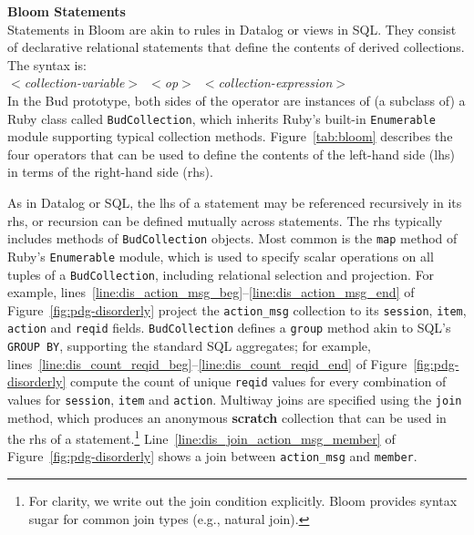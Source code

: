 \textbf{Bloom Statements}\\
\noindent
Statements in Bloom are akin to rules in Datalog or views in SQL.  They consist
of declarative relational statements that define the contents of derived
collections.  The syntax is:\\ \noindent
\mbox{\hspace{0.25in}\emph{$<$collection-variable$>$ $<$op$>$
$<$collection-expression$>$}}\\ \noindent In the Bud prototype, both sides of
the operator are instances of (a subclass of) a Ruby class called
\texttt{BudCollection}, which inherits Ruby's built-in \texttt{Enumerable}
module supporting typical collection methods.  Figure~\ref{tab:bloom} describes
the four operators that can be used to define the contents of the left-hand
side (lhs) in terms of the right-hand side (rhs).

As in Datalog or SQL, the lhs of a statement may be referenced recursively in
its rhs, or recursion can be defined mutually across statements.  The rhs
typically includes methods of \texttt{BudCollection} objects.  Most common is
the \texttt{map} method of Ruby's \texttt{Enumerable} module, which is used to
specify scalar operations on all tuples of a \texttt{BudCollection}, including
relational selection and projection. For example,
lines~\ref{line:dis_action_msg_beg}--\ref{line:dis_action_msg_end} of Figure~\ref{fig:pdg-disorderly} project the
\texttt{action\_msg} collection to its \texttt{session}, \texttt{item},
\texttt{action} and \texttt{reqid} fields.  \texttt{BudCollection} defines a
\texttt{group} method akin to SQL's \texttt{GROUP BY}, supporting the standard
SQL aggregates; for example, lines~\ref{line:dis_count_reqid_beg}--\ref{line:dis_count_reqid_end} of
Figure~\ref{fig:pdg-disorderly} compute the count 
of unique \texttt{reqid} values for every combination of values for
\texttt{session}, \texttt{item} and \texttt{action}.
Multiway joins are specified using the \texttt{join} method, which produces an anonymous \textbf{scratch} collection that can
be used in the rhs of a statement.\footnote{For clarity, we write out the join condition explicitly. Bloom provides syntax sugar for common join types (e.g., natural join).}
Line~\ref{line:dis_join_action_msg_member} of Figure~\ref{fig:pdg-disorderly}
shows a join between \texttt{action\_msg} and \texttt{member}.



